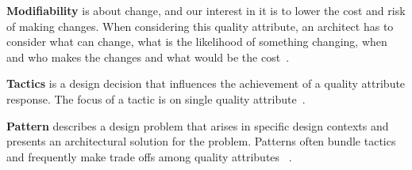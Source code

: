 \documentclass[conference]{IEEEtran}
\begin{document}
\textbf{Modifiability} is about change, and our interest in it is to lower the cost and risk of making 
changes. When considering this quality attribute, an architect has to consider what can change, what is the likelihood of something changing, when and who makes the changes and what would be the cost~\cite{b1}.

\textbf{Tactics} is a design decision that influences the achievement of a quality attribute response. The focus of a tactic is on single quality attribute~\cite{b1}.

\textbf{Pattern} describes a design problem that arises in specific design contexts and presents an architectural solution for the problem. Patterns often bundle tactics and frequently make trade offs among quality attributes ~\cite{b1}. 

\color{black}



\end{document}
